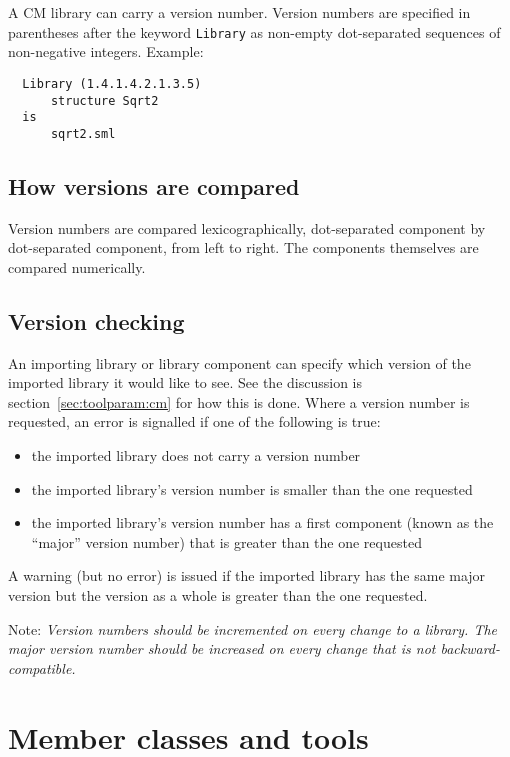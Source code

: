 \documentclass[titlepage,letterpaper]{article}
\begin{document}
A CM library can carry a version number.  Version numbers are
specified in parentheses after the keyword {\tt Library} as non-empty
dot-separated sequences of non-negative integers.  Example:

\begin{verbatim}
  Library (1.4.1.4.2.1.3.5)
      structure Sqrt2
  is
      sqrt2.sml
\end{verbatim}

\subsection{How versions are compared}

Version numbers are compared lexicographically, dot-separated
component by dot-separated component, from left to right.  The
components themselves are compared numerically.

\subsection{Version checking}

An importing library or library component can specify which version of
the imported library it would like to see.  See the discussion is
section~\ref{sec:toolparam:cm} for how this is done.  Where a version
number is requested, an error is signalled if one of the following is
true:

\begin{itemize}
\item the imported library does not carry a version number
\item the imported library's version number is smaller than the
one requested
\item the imported library's version number has a first component
(known as the ``major'' version number) that is greater than the one
requested
\end{itemize}

A warning (but no error) is issued if the imported library has the
same major version but the version as a whole is greater than the one
requested.

Note: {\it Version numbers should be incremented on every change to a
library.  The major version number should be increased on every change
that is not backward-compatible.}

\section{Member classes and tools}
\label{sec:classes}
\end{document}
